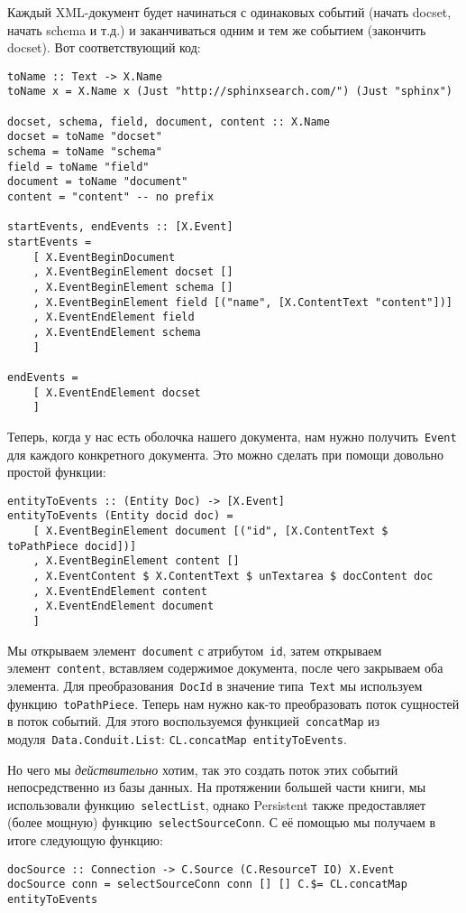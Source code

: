 Каждый XML-документ будет начинаться с одинаковых событий (начать docset, начать schema и т.д.) и заканчиваться одним и тем же событием (закончить docset). Вот соответствующий код:
\begin{lstlisting}
toName :: Text -> X.Name
toName x = X.Name x (Just "http://sphinxsearch.com/") (Just "sphinx")

docset, schema, field, document, content :: X.Name
docset = toName "docset"
schema = toName "schema"
field = toName "field"
document = toName "document"
content = "content" -- no prefix

startEvents, endEvents :: [X.Event]
startEvents =
    [ X.EventBeginDocument
    , X.EventBeginElement docset []
    , X.EventBeginElement schema []
    , X.EventBeginElement field [("name", [X.ContentText "content"])]
    , X.EventEndElement field
    , X.EventEndElement schema
    ]

endEvents =
    [ X.EventEndElement docset
    ]
\end{lstlisting}

Теперь, когда у нас есть оболочка нашего документа, нам нужно получить~\lstinline!Event! для каждого конкретного документа. Это можно сделать при помощи довольно простой функции:
\begin{lstlisting}
entityToEvents :: (Entity Doc) -> [X.Event]
entityToEvents (Entity docid doc) =
    [ X.EventBeginElement document [("id", [X.ContentText $ toPathPiece docid])]
    , X.EventBeginElement content []
    , X.EventContent $ X.ContentText $ unTextarea $ docContent doc
    , X.EventEndElement content
    , X.EventEndElement document
    ]
\end{lstlisting}

Мы открываем элемент~\lstinline'document' с атрибутом~\lstinline'id', затем открываем элемент~\lstinline'content', вставляем содержимое документа, после чего закрываем оба элемента. Для преобразования~\lstinline!DocId! в значение типа~\lstinline!Text! мы используем функцию~\lstinline!toPathPiece!. Теперь нам нужно как-то преобразовать поток сущностей в поток событий. Для этого воспользуемся функцией~\lstinline!concatMap! из модуля~\lstinline!Data.Conduit.List!: \lstinline`CL.concatMap entityToEvents`.

Но чего мы \emph{действительно} хотим, так это создать поток этих событий непосредственно из базы данных. На протяжении большей части книги, мы использовали функцию~\lstinline!selectList!, однако Persistent также предоставляет (более мощную) функцию~\lstinline!selectSourceConn!. С её помощью мы получаем в итоге следующую функцию:
\begin{lstlisting}
docSource :: Connection -> C.Source (C.ResourceT IO) X.Event
docSource conn = selectSourceConn conn [] [] C.$= CL.concatMap entityToEvents
\end{lstlisting}%

